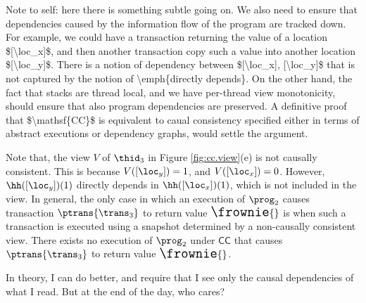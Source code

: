\ac{Note to self: here there is something subtle going on. We also need to ensure that dependencies 
caused by the information flow of the program are tracked down. For example, we could have a 
transaction returning the value of a location $[\loc_x]$, and then another transaction copy such a value 
into another location $[\loc_y]$. There is a notion of dependency between $[\loc_x], [\loc_y]$ that 
is not captured by the notion of \emph{directly depends}. On the other hand, the fact that 
stacks are thread local, and we have per-thread view monotonicity, should ensure that also program 
dependencies are preserved. A definitive proof that $\mathsf{CC}$ is equivalent to caual consistency 
specified either in terms of abstract executions or dependency graphs, would settle the argument.}

Note that, the view $V$ of $\thid_3$ in Figure \ref{fig:cc.view}(e) is not causally consistent. This is 
because $V([\loc_y]) = 1$, and $V([\loc_x]) = 0$. However, $\hh([\loc_y])(1)$ directly depends 
in $\hh([\loc_x])(1)$, which is not included in the view. 
In general, the only case in which an execution of $\prog_2$ causes transaction $\ptrans{\trans_3}$ 
to return value ${\Large \frownie{}}$ is when such a transaction is executed using a snapshot determined 
by a non-causally consistent view. There exists no execution of $\prog_2$ under $\mathsf{CC}$ that 
causes $\ptrans{\trans_3}$ to return value ${\Large \frownie{}}$.

\ac{In theory, I can do better, and require that I see only the causal dependencies 
of what I read. But at the end of the day, who cares?}

%




